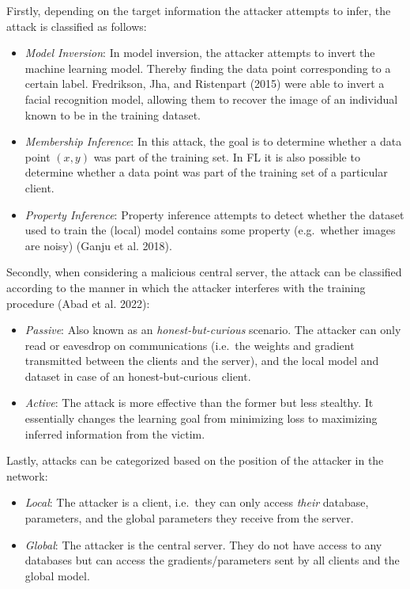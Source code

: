 \documentclass[
  compsoc]{IEEEtran}
\begin{document}
Firstly, depending on the target information the attacker attempts to
infer, the attack is classified as follows:

\begin{itemize}
\item
  \emph{Model Inversion}: In model inversion, the attacker attempts to
  invert the machine learning model. Thereby finding the data point
  corresponding to a certain label. Fredrikson, Jha, and Ristenpart
  (2015) were able to invert a facial recognition model, allowing them
  to recover the image of an individual known to be in the training
  dataset.
\item
  \emph{Membership Inference}: In this attack, the goal is to determine
  whether a data point \((x, y)\) was part of the training set. In FL it
  is also possible to determine whether a data point was part of the
  training set of a particular client.
\item
  \emph{Property Inference}: Property inference attempts to detect
  whether the dataset used to train the (local) model contains some
  property (e.g.~whether images are noisy) (Ganju et al. 2018).
\end{itemize}

Secondly, when considering a malicious central server, the attack can be
classified according to the manner in which the attacker interferes with
the training procedure (Abad et al. 2022):

\begin{itemize}
\item
  \emph{Passive}: Also known as an \emph{honest-but-curious} scenario.
  The attacker can only read or eavesdrop on communications (i.e.~the
  weights and gradient transmitted between the clients and the server),
  and the local model and dataset in case of an honest-but-curious
  client.
\item
  \emph{Active}: The attack is more effective than the former but less
  stealthy. It essentially changes the learning goal from minimizing
  loss to maximizing inferred information from the victim.
\end{itemize}

Lastly, attacks can be categorized based on the position of the attacker
in the network:

\begin{itemize}
\item
  \emph{Local}: The attacker is a client, i.e.~they can only access
  \emph{their} database, parameters, and the global parameters they
  receive from the server.
\item
  \emph{Global}: The attacker is the central server. They do not have
  access to any databases but can access the gradients/parameters sent
  by all clients and the global model.
\end{itemize}
\end{document}
